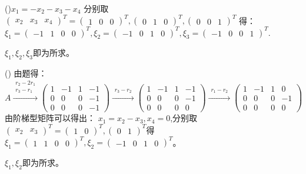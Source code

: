 \documentclass[a4paper]{report}
\begin{document}
\begin{jie}
(\uppercase\expandafter{})$x_1=-x_2-x_3-x_4$
分别取$
\begin{pmatrix}
x_2&x_3&x_4
\end{pmatrix}^T
=\begin{pmatrix}
1&0&0
\end{pmatrix}^T,\begin{pmatrix}
0&1&0
\end{pmatrix}^T,\begin{pmatrix}
0&0&1
\end{pmatrix}^T$
得：
$\xi_1
=\begin{pmatrix}
-1&1&0&0
\end{pmatrix}^T,\xi_2
=\begin{pmatrix}
-1&0&1&0
\end{pmatrix}^T,\xi_3
=\begin{pmatrix}
-1&0&0&1
\end{pmatrix}^T$.

$\xi_1,\xi_2,\xi_3$即为所求。

(\uppercase\expandafter{})
由题得：
\begin{equation*}
A\xrightarrow{\substack{r_2-2r_1\\ r_3-r_1}}{\begin{pmatrix}
1&-1&1&-1\\
0&0&0&-1\\
0&0&0&-1\end{pmatrix}
}\xrightarrow{\substack{ r_3-r_2}}{\begin{pmatrix}
1&-1&1&-1\\
0&0&0&-1\\
0&0&0&0\end{pmatrix}
}\xrightarrow{\substack{ r_1-r_2}}{\begin{pmatrix}
1&-1&1&0\\
0&0&0&-1\\
0&0&0&0\end{pmatrix}
}
\end{equation*}
由阶梯型矩阵可以得出：
$x_1=x_2-x_3,x_4=0$,分别取$\begin{pmatrix}x_2&x_3\end{pmatrix}^T=\begin{pmatrix}1&0\end{pmatrix}^T,\begin{pmatrix}0&1\end{pmatrix}^T$得
$
\xi_1=
\begin{pmatrix}
1&1&0&0
\end{pmatrix}^T,\xi_2=
\begin{pmatrix}
-1&0&1&0
\end{pmatrix}^T
$。

$\xi_1,\xi_2$即为所求。
\end{jie}
\end{document}
